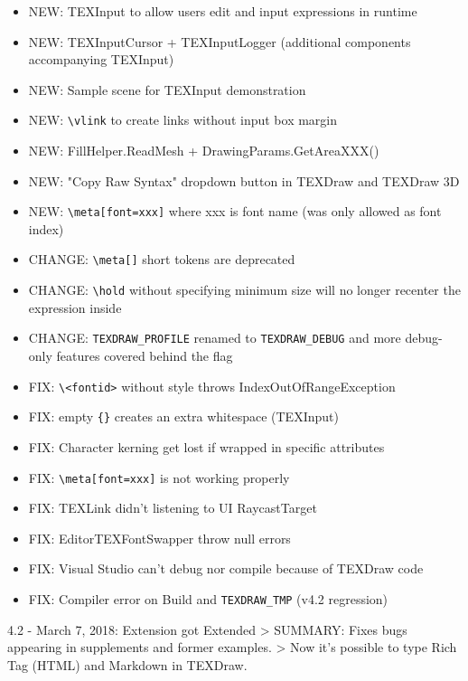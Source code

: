 \documentclass[12pt]{article}
\begin{document}
\begin{itemize}
\item NEW: TEXInput to allow users edit and input expressions in runtime
\item NEW: TEXInputCursor + TEXInputLogger (additional components accompanying TEXInput)
\item NEW: Sample scene for TEXInput demonstration
\item NEW: \verb|\vlink| to create links without input box margin
\item NEW: FillHelper.ReadMesh + DrawingParams.GetAreaXXX()
\item NEW: "Copy Raw Syntax" dropdown button in TEXDraw and TEXDraw 3D
\item NEW: \verb|\meta[font=xxx]| where xxx is font name (was only allowed as font index)
\item CHANGE: \verb|\meta[]| short tokens are deprecated
\item CHANGE: \verb|\hold| without specifying minimum size will no longer recenter the expression inside
\item CHANGE: \verb|TEXDRAW_PROFILE| renamed to \verb|TEXDRAW_DEBUG| and more debug-only features covered behind the flag
\item FIX: \verb|\<fontid>| without style throws IndexOutOfRangeException
\item FIX: empty \verb|{}| creates an extra whitespace (TEXInput)
\item FIX: Character kerning get lost if wrapped in specific attributes
\item FIX: \verb|\meta[font=xxx]| is not working properly
\item FIX: TEXLink didn't listening to UI RaycastTarget
\item FIX: EditorTEXFontSwapper throw null errors
\item FIX: Visual Studio can't debug nor compile because of TEXDraw code
\item FIX: Compiler error on Build and \verb|TEXDRAW_TMP| (v4.2 regression)
\end{itemize}

4.2 - March 7, 2018: Extension got Extended
> SUMMARY: Fixes bugs appearing in supplements and former examples.
> Now it's possible to type Rich Tag (HTML) and Markdown in TEXDraw.
\end{document}
